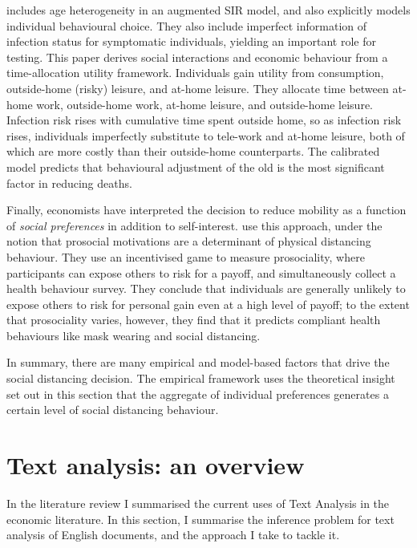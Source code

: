 \documentclass{article}
\begin{document}
\textcite{brotherhoodEconomicModelCOVID192020} includes age heterogeneity in an augmented SIR model, and also explicitly models individual behavioural choice. They also include imperfect information of infection status for symptomatic individuals, yielding an important role for testing. This paper derives social interactions and economic behaviour from a time-allocation utility framework. Individuals gain utility from consumption, outside-home (risky) leisure, and at-home leisure. They allocate time between at-home work, outside-home work, at-home leisure, and outside-home leisure. Infection risk rises with cumulative time spent outside home, so as infection risk rises, individuals imperfectly substitute to tele-work and at-home leisure, both of which are more costly than their outside-home counterparts. The calibrated model predicts that behavioural adjustment of the old is the most significant factor in reducing deaths.

Finally, economists have interpreted the decision to reduce mobility as a function of \textit{social preferences} \parencite{fehrTheoryFairnessCompetition1999} in addition to self-interest. \textcite{campos-mercadeProsocialityPredictsHealth2021} use this approach, under the notion that prosocial motivations are a determinant of physical distancing behaviour. They use an incentivised game to measure prosociality, where participants can expose others to risk for a payoff, and simultaneously collect a health behaviour survey. They conclude that individuals are generally unlikely to expose others to risk for personal gain even at a high level of payoff; to the extent that prosociality varies, however, they find that it predicts compliant health behaviours like mask wearing and social distancing. 

In summary, there are many empirical and model-based factors that drive the social distancing decision. The empirical framework uses the theoretical insight set out in this section that the aggregate of individual preferences generates a certain level of social distancing behaviour. 
\section{Text analysis: an overview}\label{textan}
In the literature review I summarised the current uses of Text Analysis in the economic literature. In this section, I summarise the inference problem for text analysis of English documents, and the approach I take to tackle it.
\end{document}
